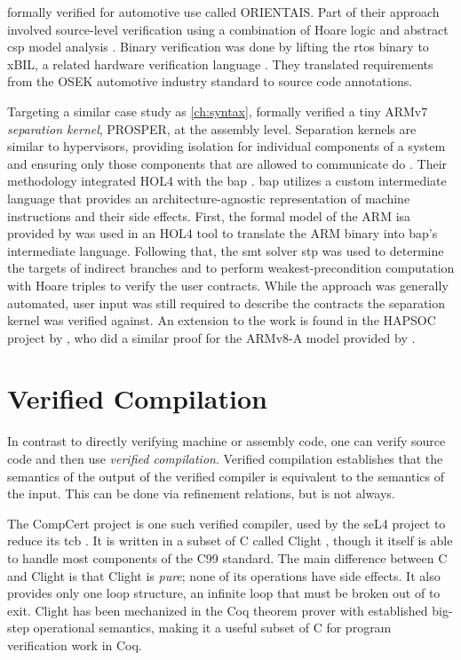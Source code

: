 \textcite{shi2012orientais} formally verified  for automotive use
called ORIENTAIS.
Part of their approach involved source-level verification
using a combination of Hoare logic
and abstract \ac{csp} model analysis \autocite{hoare1978csp}.
Binary verification was done by lifting the \ac{rtos} binary to xBIL,
a related hardware verification language \autocite{shi2012xbil}.
They translated requirements from the OSEK automotive industry standard
to source code annotations.

Targeting a similar case study as \cref{ch:syntax},
\textcite{dam2013hypervisor,dam2013formal}
formally verified a tiny ARMv7 \emph{separation kernel},%
PROSPER, at the assembly level.
Separation kernels are similar to hypervisors,
providing isolation for individual components of a system and ensuring
only those components that are allowed to communicate do \autocite{rushby1981dvss}.
Their methodology integrated HOL4 with the \ac{bap} \autocite{brumley2011bap}.
\Ac{bap} utilizes a custom intermediate language
that provides an architecture-agnostic representation of machine instructions
and their side effects.
First, the formal model of the ARM \ac{isa} provided by \textcite{fox2010arm} was used
in an HOL4 tool to translate the ARM binary into \ac{bap}'s intermediate language.
Following that, the \ac{smt} solver \ac{stp}  \autocite{ganesh2007stp}
was used to determine the targets of indirect branches
and to perform weakest-precondition computation with Hoare triples
to verify the user contracts.
While the approach was generally automated,
user input was still required to describe the contracts
the separation kernel was verified against.
An extension to the work is found in the HAPSOC project by \textcite{baumann2016high},
who did a similar proof for the ARMv8-A model provided by \textcite{fox2015improved}.

\section{Verified Compilation}\label{se:verified}
In contrast to directly verifying machine or assembly code,
one can verify source code and then use \emph{verified compilation}.%
Verified compilation establishes that
the semantics of the output of the verified compiler
is equivalent to the semantics of the input.
This can be done via refinement relations, but is not always.

The CompCert project is one such verified compiler,
used by the seL4 project to reduce its \ac{tcb} \autocite{Klein_AEMSKH_14}.
It is written in a subset of C
called Clight \autocite{leroy:compcert,blazy2009clight},
though it itself is able to handle most components of the C99 standard.
The main difference between C and Clight is that Clight is \emph{pure};
none of its operations have side effects. It also provides only one loop structure,
an infinite loop that must be broken out of to exit.
Clight has been mechanized in the Coq theorem prover with established
big-step operational semantics, making it a useful subset of C
for program verification work in Coq.

